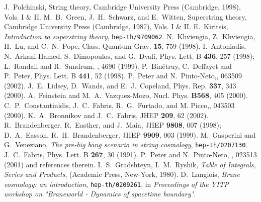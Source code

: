 \documentclass[a4paper,aps,twocolumn,prd,showpacs,nofootinbib]{revtex4}
\begin{document}
\begin{thebibliography}{90}
 J.~Polchinski, String theory, Cambridge
University Press (Cambridge, 1998), Vols. I \& II.
 M.~B.~Green, J.~H.~Schwarz, and E.~Witten, Superstring
theory, Cambridge University Press (Cambridge, 1987), Vols. I \& II.
 E.~Kiritsis, {\it Introduction to superstring
theory}, {\tt hep-th/9709062}.
 N.~Khviengia, Z.~Khviengia, H.~Lu, and C.~N.~Pope,
Class. Quantum Grav.  {\bf 15}, 759 (1998).
 I.~Antoniadis, N.~Arkani-Hamed, S.~Dimopoulos, and
G.~Dvali, Phys. Lett. B {\bf 436}, 257 (1998); L.~Randall and
R.~Sundrum, , 4690 (1999).
 P.~Bin\'etruy, C.~Deffayet and P.~Peter, Phys. Lett.  B
{\bf 441}, 52 (1998).
 P.~Peter and N.~Pinto-Neto,, 063509
(2002).
 J.~E.~Lidsey, D.~Wands, and E.~J.~Copeland,
Phys. Rep.  {\bf 337}, 343 (2000).
 A.~Feinstein and M.~A.~Vazquez-Mozo, Nucl. Phys.
{\bf B568}, 405 (2000).
 C.~P.~Constantinidis, J.~C.~Fabris, R.~G.~Furtado, and
M. Picco,, 043503 (2000).
 K.~A.~Bronnikov and J.~C.~Fabris, JHEP {\bf 209}, 62
(2002).
 R.~Brandenberger, R.~Easther, and J.~Maia, JHEP {\bf
9808}, 007 (1998); D.~A.~Easson, R.~H.~Brandenberger, JHEP {\bf 9909},
003 (1999).
 M.~Gasperini and G.~Veneziano, {\it The pre-big
bang scenario in string cosmology}, {\tt hep-th/0207130}.
 J.~C.~Fabris, Phys. Lett. B {\bf 267}, 30 (1991).
 P.~Peter and N.~Pinto-Neto, , 023513
(2001) and references therein.
 I.~S.~Gradshteyn, I.~M.~Ryshik, {\sl Table of
Integrals, Series and Products}, (Academic Press, New-York, 1980).
 D.~Langlois, {\it Brane cosmology: an
introduction}, {\tt hep-th/0209261}, in {\sl Proceedings of the YITP
workshop on "Braneworld - Dynamics of spacetime boundary"}.
\end{thebibliography}
\end{document}
